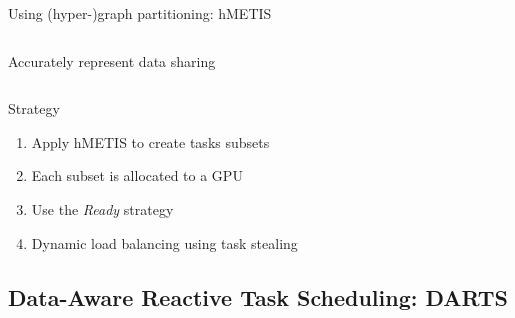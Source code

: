 \documentclass{libs/ufc_format}
\begin{document}
\begin{frame}{Using (hyper-)graph partitioning: hMETIS}
\begin{columns}{}
\begin{column}{0.6\textwidth}
Accurately represent data sharing
\end{column}
\end{columns}
	\begin{block}{Strategy}
	\begin{enumerate}
		\item Apply hMETIS to create tasks subsets
		\item Each subset is allocated to a GPU
		\item Use the \emph{Ready} strategy
		\item Dynamic load balancing using task stealing
	\end{enumerate}
	\end{block}
\end{frame}

\subsection{Data-Aware Reactive Task Scheduling: DARTS}


	
\end{document}

